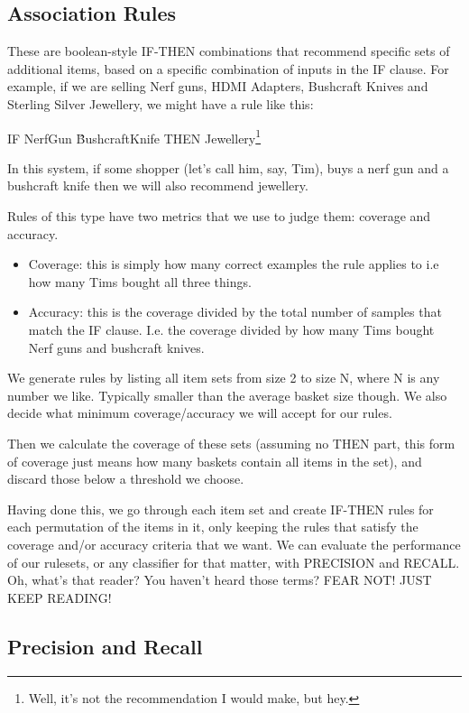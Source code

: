 \documentclass{article}
\begin{document}
    \subsection{Association Rules}
    These are boolean-style IF-THEN combinations that recommend specific sets of additional items, based on a specific combination of inputs in the IF clause. For example, if we are selling Nerf guns, HDMI Adapters, Bushcraft Knives and Sterling Silver Jewellery, we might have a rule like this:
    \begin{center}
        IF NerfGun \^ BushcraftKnife THEN Jewellery\footnote{Well, it's not the recommendation I would make, but hey.}
    \end{center}
    In this system, if some shopper (let's call him, say, Tim), buys a nerf gun and a bushcraft knife then we will also recommend jewellery.
    
    Rules of this type have two metrics that we use to judge them: coverage and accuracy.
    \begin{itemize}
        \item Coverage: this is simply how many correct examples the rule applies to i.e how many Tims bought all three things.
        \item Accuracy: this is the coverage divided by the total number of samples that match the IF clause. I.e. the coverage divided by how many Tims bought Nerf guns and bushcraft knives.
    
    \end{itemize}
    We generate rules by listing all item sets from size 2 to size N, where N is any number we like. Typically smaller than the average basket size though. We also decide what minimum coverage/accuracy we will accept for our rules.
    
    Then we calculate the coverage of these sets (assuming no THEN part, this form of coverage just means how many baskets contain all items in the set), and discard those below a threshold we choose.
    
    Having done this, we go through each item set and create IF-THEN rules for each permutation of the items in it, only keeping the rules that satisfy the coverage and/or accuracy criteria that we want. We can evaluate the performance of our rulesets, or any classifier for that matter, with PRECISION and RECALL. Oh, what's that reader? You haven't heard those terms? FEAR NOT! JUST KEEP READING!
    \subsection{Precision and Recall}
    
\end{document}
